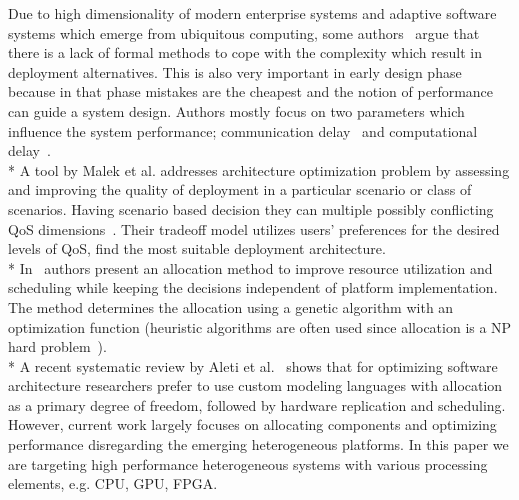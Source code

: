 \documentclass{sig-alternate}
\begin{document}
Due to high dimensionality of modern enterprise systems and adaptive software systems which emerge from ubiquitous computing, some authors~\cite{da2011enterprise} argue that there is a lack of formal methods to cope with the complexity which result in deployment alternatives. This is also very important in early design phase because in that phase mistakes are the cheapest and the notion of performance can guide a system design. Authors mostly focus on two parameters which influence the system performance; communication delay~\cite{ccelik2013s} and computational delay~\cite{santinelli2010component,wang2004early}.
\\*
A tool by Malek et al. addresses architecture optimization problem by assessing and improving the quality of deployment in a particular scenario or class of scenarios. Having scenario based decision they can multiple possibly conflicting QoS dimensions~\cite{Malek2012}. Their tradeoff model utilizes users' preferences for the desired levels of QoS, find the most suitable deployment architecture.
\\*
In~\cite{ccelik2013s} authors present an allocation method to improve resource utilization and scheduling while keeping the decisions independent of platform implementation. The method determines the allocation using a genetic algorithm with an optimization function (heuristic algorithms are often used since allocation is a NP hard problem~\cite{ssaed2012metaheuristic}).
\\*
A recent systematic review by Aleti et al.~\cite{Aleti2013} shows that for optimizing software architecture researchers prefer to use custom modeling languages with allocation as a primary degree of freedom, followed by hardware replication and scheduling. However, current work largely focuses on allocating components and optimizing performance disregarding the emerging heterogeneous platforms. In this paper we are targeting high performance heterogeneous systems with various processing elements, e.g. CPU, GPU, FPGA.
 
\end{document}
